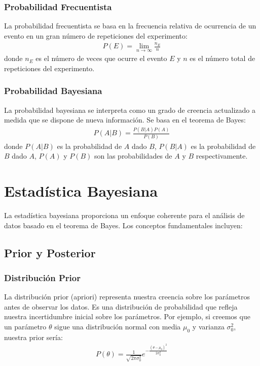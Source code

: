 \subsubsection{Probabilidad Frecuentista}

La probabilidad frecuentista se basa en la frecuencia relativa de ocurrencia de un evento en un gran n\'umero de repeticiones del experimento:
\begin{eqnarray*}
P(E) = \lim_{n \to \infty} \frac{n_E}{n}
\end{eqnarray*}
donde $n_E$ es el n\'umero de veces que ocurre el evento $E$ y $n$ es el n\'umero total de repeticiones del experimento.

\subsubsection{Probabilidad Bayesiana}

La probabilidad bayesiana se interpreta como un grado de creencia actualizado a medida que se dispone de nueva informaci\'on. Se basa en el teorema de Bayes:
\begin{eqnarray*}
P(A|B) = \frac{P(B|A)P(A)}{P(B)}
\end{eqnarray*}
donde $P(A|B)$ es la probabilidad de $A$ dado $B$, $P(B|A)$ es la probabilidad de $B$ dado $A$, $P(A)$ y $P(B)$ son las probabilidades de $A$ y $B$ respectivamente.

\section{Estad\'istica Bayesiana}

La estad\'istica bayesiana proporciona un enfoque coherente para el an\'alisis de datos basado en el teorema de Bayes. Los conceptos fundamentales incluyen:

\subsection{Prior y Posterior}

\subsubsection{Distribuci\'on Prior}

La distribuci\'on prior (apriori) representa nuestra creencia sobre los par\'ametros antes de observar los datos. Es una distribuci\'on de probabilidad que refleja nuestra incertidumbre inicial sobre los par\'ametros. Por ejemplo, si creemos que un par\'ametro $\theta$ sigue una distribuci\'on normal con media $\mu_0$ y varianza $\sigma_0^2$, nuestra prior ser\'ia:
\begin{eqnarray*}
P(\theta) = \frac{1}{\sqrt{2\pi\sigma_0^2}} e^{-\frac{(\theta-\mu_0)^2}{2\sigma_0^2}}
\end{eqnarray*}

